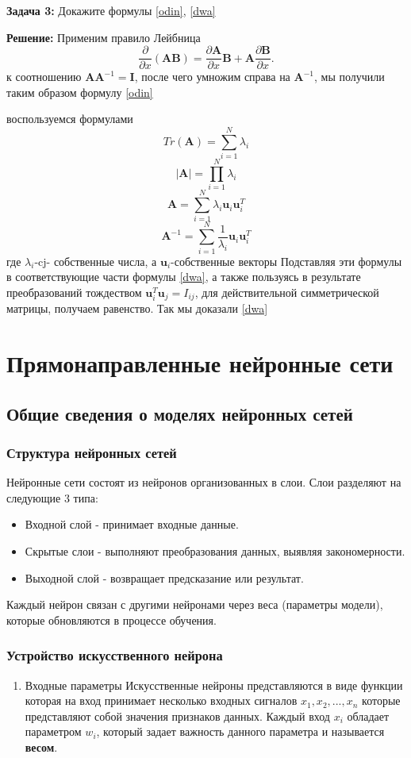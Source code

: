{\textbf{Задача 3:}
Докажите формулы \ref{odin}, \ref{dwa} \

\textbf{Решение:}
Применим правило Лейбница
\[
    \frac{\partial}{\partial x} (\mathbf{AB})=\frac{\partial \mathbf{A}}{\partial x}
    \mathbf{B}+\mathbf{A}\frac{\partial \mathbf{B}}{\partial x}.
\]
к соотношению $\mathbf{AA}^{-1}=\mathbf{I}$, после чего умножим справа на $\mathbf{A}^{-1}$, мы получили таким образом формулу \ref{odin}

воспользуемся формулами
\[
    Tr(\mathbf{A})=\displaystyle \sum_{i=1}^{N} \lambda_i
\]
\[
    |\mathbf{A}|=\displaystyle \prod_{i=1}^{N} \lambda_i
\]
\[
    \mathbf{A}=\displaystyle \sum_{i=1}^{N} \lambda_i \mathbf{u}_i\mathbf{u}_i^{T}
\]
\[
    \mathbf{A}^{-1}=\displaystyle \sum_{i=1}^{N} \frac{1}{\lambda_i} \mathbf{u}_i\mathbf{u}_i^{T}
\]
где $\lambda_i$-cj- собственные числа, а $\mathbf{u}_i$-собственные векторы
Подставляя эти формулы в соответствующие части формулы \ref{dwa}, а также пользуясь в результате преобразований тождеством $\mathbf{u}_i^{T}\mathbf{u}_j=I_{ij}$, для действительной симметрической матрицы, получаем равенство. Так мы доказали \ref{dwa}


\section{Прямонаправленные нейронные сети}
\subsection{Общие сведения о моделях нейронных сетей}

\subsubsection{Структура нейронных сетей}

Нейронные сети состоят из нейронов организованных в слои. Слои разделяют на следующие 3 типа:
\begin{itemize}
    \item Входной слой - принимает входные данные.
    \item Скрытые слои - выполняют преобразования данных, выявляя закономерности.
    \item Выходной слой - возвращает предсказание или результат.
\end{itemize}

Каждый нейрон связан с другими нейронами через веса (параметры модели), которые обновляются в
процессе обучения.
\subsubsection{Устройство искусственного нейрона}
\begin{enumerate}
    \item Входные параметры
          Искусственные нейроны представляются в виде функции которая на вход принимает несколько входных
          сигналов \(x_{1}, x_{2}, ..., x_{n}\) которые представляют собой значения признаков данных. Каждый
          вход \(x_{i}\) обладает параметром \(w_{i}\), который задает важность данного параметра и называется
          \textbf{весом}.


\end{enumerate}}
